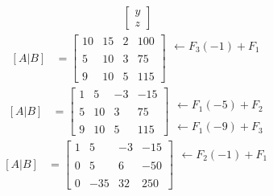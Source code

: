 \documentclass[10pt, a4paper]{article}
\begin{document}
\begin{multicols*}{2}
\begin{align*}
\begin{bmatrix}
    y\\
    z
  \end{bmatrix}
\end{align*}
\begin{align*}
  \left[A|B\right]&=\left[
    \begin{array}{ccc|c}
      10 & 15 & 2 & 100 \\\\
      5 & 10 & 3 & 75 \\\\
      9 & 10 & 5 & 115
    \end{array}
  \right]
  \begin{array}{r}
    \leftarrow F_3\left(-1\right)+F_1 \\\\\\\\\\
  \end{array}
\end{align*}
\begin{align*}
  \left[A|B\right]&=\left[
    \begin{array}{ccc|c}
      1 & 5 & -3 & -15 \\\\
      5 & 10 & 3 & 75 \\\\
      9 & 10 & 5 & 115
    \end{array}
  \right]
  \begin{array}{r}
    \\\\
    \leftarrow F_1\left(-5\right)+F_2 \\\\
    \leftarrow F_1\left(-9\right)+F_3
  \end{array}
\end{align*}
\begin{align*}
  \left[A|B\right]&=\left[
    \begin{array}{ccc|c}
      1 & 5 & -3 & -15 \\\\
      0 & 5 & 6 & -50 \\\\
      0 & -35 & 32 & 250
    \end{array}
  \right]
  \begin{array}{r}
    \leftarrow F_2\left(-1\right)+F_1
    \\\\\\\\

\end{array}
\end{align*}
\end{multicols*}
\end{document}
